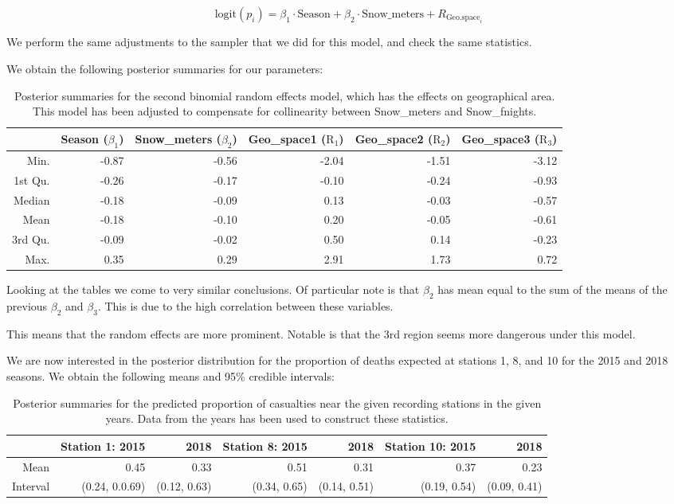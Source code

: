 \documentclass[10pt]{extarticle}
\begin{document}
\[
\mathrm{logit}(p_i) = \beta_1 \cdot \mathrm{Season} + \beta_2 \cdot \mathrm{Snow\_meters} + R_{\mathrm{Geo.space}_i}
\]

We perform the same adjustments to the sampler that we did for this model, and check the same statistics.

We obtain the following posterior summaries for our parameters:

\begin{table}[ht]
	\centering
	\begin{tabular}{r|rrrrr}
		\hline
		& Season ($\beta_1$) & Snow\_meters ($\beta_2$) & Geo\_space1 ($\mathrm{R}_{1}$) & Geo\_space2 ($\mathrm{R}_{2}$) & Geo\_space3 ($\mathrm{R}_{3}$)\\ 
		\hline
		Min. & -0.87 & -0.56 & -2.04 & -1.51 & -3.12 \\ 
		1st Qu. & -0.26 & -0.17 & -0.10 & -0.24 & -0.93 \\ 
		Median & -0.18 & -0.09 & 0.13 & -0.03 & -0.57 \\ 
		Mean & -0.18 & -0.10 & 0.20 & -0.05 & -0.61 \\ 
		3rd Qu. & -0.09 & -0.02 & 0.50 & 0.14 & -0.23 \\ 
		Max. & 0.35 & 0.29 & 2.91 & 1.73 & 0.72 \\ 
		\hline
	\end{tabular}
\caption{Posterior summaries for the second binomial random effects model, which has the effects on geographical area. This model has been adjusted to compensate for collinearity between Snow\_meters and Snow\_fnights.}
\label{tab:postsum_binmod2}
\end{table}

Looking at the tables we come to very similar conclusions. Of particular note is that $\beta_2$ has mean equal to the sum of the means of the previous $\beta_2$ and $\beta_3$. This is due to the high correlation between these variables. 

This means that the random effects are more prominent. Notable is that the 3rd region seems more dangerous under this model. 

We are now interested in the posterior distribution for the proportion of deaths expected at stations 1, 8, and 10 for the 2015 and 2018 seasons. We obtain the following means and 95\% credible intervals:

\begin{table}[ht]
	\centering
	\begin{tabular}{r|rr|rr|rr}
			\hline
			& Station 1: 2015 & 2018 & Station 8: 2015 & 2018 & Station 10: 2015 & 2018 \\
			\hline
			Mean & 0.45 & 0.33 & 0.51 & 0.31 & 0.37 & 0.23 \\
			Interval & (0.24, 0.0.69) & (0.12, 0.63) & (0.34, 0.65) & (0.14, 0.51) & (0.19, 0.54) & (0.09, 0.41)\\
			\hline
	\end{tabular}
\caption{Posterior summaries for the predicted proportion of casualties near the given recording stations in the given years. Data from the years has been used to construct these statistics.}
\label{tab:postprop}
\end{table}
\end{document}
